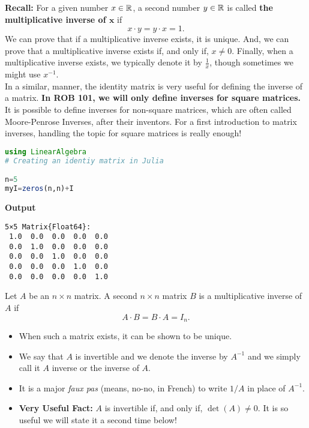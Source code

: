 \textbf{Recall:} For a given number $x\in \mathbb R$, a second number $y\in \mathbb R$ is called \textbf{the multiplicative inverse of $\mathbf{x}$} if 
$$ x \cdot y = y \cdot x = 1. $$
We can prove that if a multiplicative inverse exists, it is unique. And, we can prove that a multiplicative inverse exists if, and only if, $x \ne 0$. Finally, when a multiplicative inverse exists, we typically denote it by $\frac{1}{x}$, though sometimes we might use $x^{-1}$. \\

In a similar, manner, the identity matrix is very useful for defining the inverse of a matrix. \textbf{In ROB 101, we will only define inverses for square matrices.} It is possible to define inverses for non-square matrices, which are often called Moore-Penrose Inverses, after their inventors. For a first introduction to matrix inverses, handling the topic for square matrices is really enough!

\begin{lstlisting}[language=Julia,style=mystyle]
using LinearAlgebra
# Creating an identiy matrix in Julia

n=5
myI=zeros(n,n)+I
\end{lstlisting}
\textbf{Output}
\begin{verbatim}
5×5 Matrix{Float64}:
 1.0  0.0  0.0  0.0  0.0
 0.0  1.0  0.0  0.0  0.0
 0.0  0.0  1.0  0.0  0.0
 0.0  0.0  0.0  1.0  0.0
 0.0  0.0  0.0  0.0  1.0
\end{verbatim}

\begin{tcolorbox}[sharp corners, colback=green!30, colframe=green!80!blue, title=\textbf{\large The Inverse of a Square Matrix}]
 Let $A$ be an $n \times n$ matrix. A second $n \times n$ matrix $B$ is a multiplicative inverse of $A$ if
 $$A \cdot B = B \cdot A = I_n. $$
 \begin{itemize}
     \item When such a matrix exists, it can be shown to be unique.
     \item We say that $A$ is invertible and we denote the inverse by $A^{-1}$ and we simply call it $A$ inverse or the inverse of $A$.
     \item It is a major \textit{faux pas} (means, no-no, in French) to write $1/A$ in place of $A^{-1}$.
     \item \textbf{Very Useful Fact:} $A$ is invertible if, and only if, $\det(A) \neq 0$. It is so useful we will state it a second time below!
 \end{itemize}
\end{tcolorbox}
\vspace*{.1cm}


